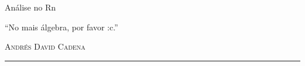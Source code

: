 \begin{titlepage}
\vspace*{2cm}

\noindent
\vspace*{0.5cm}
  \titlefont \hspace{-2cm}Análise no Rn \vspace{-0.32cm}\par
\vspace{1cm}
\epigraph{``No mais álgebra, por favor :c.''}
{ \textsc{Andrés David Cadena}}
\null\vfill
\vspace*{1cm}
\noindent
\hfill
\begin{minipage}{0.45\linewidth}
    \begin{flushright}
        \printauthor
    \end{flushright}
\end{minipage}
%
\begin{minipage}{0.02\linewidth}
    \rule{1pt}{120pt}
\end{minipage}
\titlepagedecoration
\end{titlepage}
